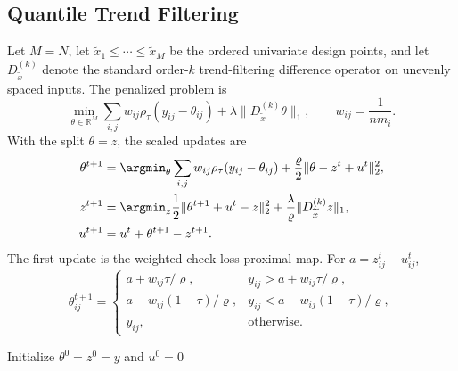 \documentclass[twoside,11pt]{article}
\newenvironment{revision}{\color{revisionred}}{}
\begin{document}
\subsection{Quantile Trend Filtering}
\begin{revision}
Let $M=N$, let $\widetilde x_1\le\cdots\le\widetilde x_M$ be the ordered univariate design points, and let $D^{(k)}_{\widetilde x}$ denote the standard order-$k$ trend-filtering difference operator on unevenly spaced inputs. The penalized problem is
\begin{equation}
 \min_{\theta\in\mathbb R^M}
 \sum_{i,j}w_{ij}\rho_\tau(y_{ij}-\theta_{ij})
 +\lambda\|D^{(k)}_{\widetilde x}\theta\|_1,
 \qquad w_{ij}=\frac1{nm_i}.                                 \label{70}
\end{equation}
With the split $\theta=z$, the scaled updates are
\begin{align}
 \theta^{t+1}&=\argmin_\theta
 \sum_{i,j}w_{ij}\rho_\tau(y_{ij}-\theta_{ij})
 +\frac\varrho2\|\theta-z^t+u^t\|_2^2,                     \label{71}\\
 z^{t+1}&=\argmin_z\frac12\|\theta^{t+1}+u^t-z\|_2^2
 +\frac\lambda\varrho\|D^{(k)}_{\widetilde x}z\|_1,       \label{72}\\
 u^{t+1}&=u^t+\theta^{t+1}-z^{t+1}.                           \label{73}
\end{align}
The first update is the weighted check-loss proximal map. For $a=z^t_{ij}-u^t_{ij}$,
\begin{equation}
 \theta^{t+1}_{ij}=
 \begin{cases}
 a+w_{ij}\tau/\varrho,&y_{ij}>a+w_{ij}\tau/\varrho,\\
 a-w_{ij}(1-\tau)/\varrho,&y_{ij}<a-w_{ij}(1-\tau)/\varrho,\\
 y_{ij},&\text{otherwise}.
 \end{cases}                                                  \label{74}
\end{equation}
\end{revision}

\begin{algorithm}[!htbp]
\caption{ADMM for quantile trend filtering}\label{alg_tf_admm}
Initialize $\theta^0=z^0=y$ and $u^0=0$\;
\end{algorithm}
\end{document}

